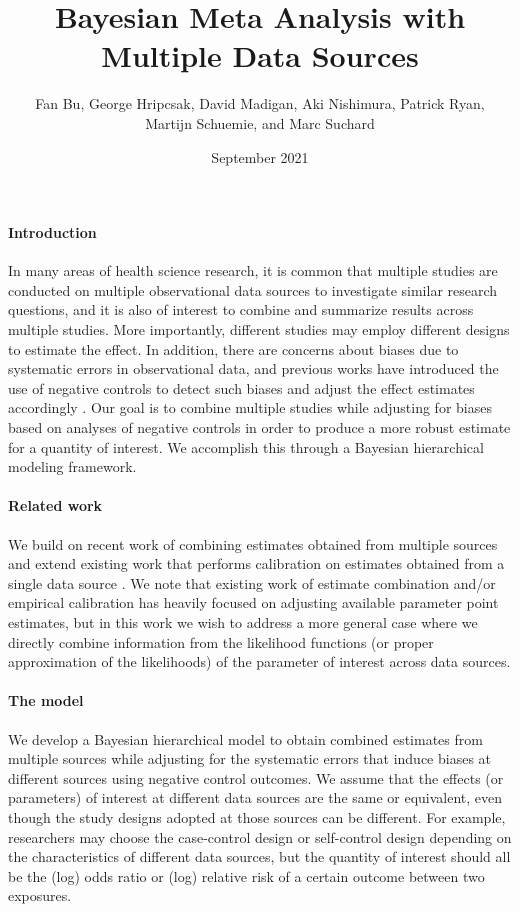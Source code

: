 \documentclass{article}
\title{Bayesian Meta Analysis with Multiple Data Sources}
\author{Fan Bu, George Hripcsak, David Madigan, Aki Nishimura, Patrick Ryan, \\Martijn Schuemie, and Marc Suchard}
\date{September 2021}
\begin{document}
\maketitle


\paragraph{Introduction} In many areas of health science research, it is common that multiple studies are conducted on multiple observational data sources to investigate similar research questions,
and it is also of interest to combine and summarize results across multiple studies.
More importantly, different studies may employ different designs to estimate the effect.
In addition, there are concerns about biases due to systematic errors in observational data,
and previous works have introduced the use of negative controls to detect such biases and adjust the effect estimates accordingly \citep{lipsitch2010negative,arnold2016brief,schuemie2018empirical}.
Our goal is to combine multiple studies while adjusting for biases based on analyses of negative controls in order to produce a more robust estimate for a quantity of interest.
We accomplish this through a Bayesian hierarchical modeling framework.


\paragraph{Related work}
We build on recent work of combining estimates obtained from multiple sources \citep{yao2021bivariate}
and extend existing work that performs calibration on estimates obtained from a single data source \citep{mulgrave2020bayesian}.
We note that existing work of estimate combination and/or empirical calibration has heavily focused on adjusting available parameter point estimates,
but in this work we wish to address a more general case where we directly combine information from the likelihood functions (or proper approximation of the likelihoods) of the parameter of interest across data sources.

\paragraph{The model}
We develop a Bayesian hierarchical model to obtain combined estimates from multiple sources
while adjusting for the systematic errors that induce biases at different sources using negative control outcomes.
We assume that the effects (or parameters) of interest at different data sources are the same or equivalent, even though the study designs adopted at those sources can be different.
For example, researchers may choose the case-control design or self-control design depending on the characteristics of different data sources,
but the quantity of interest should all be the (log) odds ratio or (log) relative risk of a certain outcome between two exposures.
\end{document}
